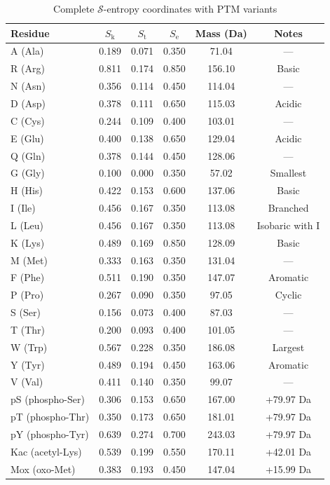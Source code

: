 \documentclass[11pt,twocolumn]{article}
\newcommand{\sentropy}{$\mathcal{S}$-entropy}
\newcommand{\Sk}{S_{\text{k}}}
\newcommand{\St}{S_{\text{t}}}
\newcommand{\Se}{S_{\text{e}}}
\begin{document}
\begin{table}[h]
\centering
\caption{Complete \sentropy{} coordinates with PTM variants}
\label{tab:complete_coords}
\begin{tabular}{@{}lccccc@{}}
\toprule
Residue & $\Sk$ & $\St$ & $\Se$ & Mass (Da) & Notes \\
\midrule
A (Ala) & 0.189 & 0.071 & 0.350 & 71.04 & --- \\
R (Arg) & 0.811 & 0.174 & 0.850 & 156.10 & Basic \\
N (Asn) & 0.356 & 0.114 & 0.450 & 114.04 & --- \\
D (Asp) & 0.378 & 0.111 & 0.650 & 115.03 & Acidic \\
C (Cys) & 0.244 & 0.109 & 0.400 & 103.01 & --- \\
E (Glu) & 0.400 & 0.138 & 0.650 & 129.04 & Acidic \\
Q (Gln) & 0.378 & 0.144 & 0.450 & 128.06 & --- \\
G (Gly) & 0.100 & 0.000 & 0.350 & 57.02 & Smallest \\
H (His) & 0.422 & 0.153 & 0.600 & 137.06 & Basic \\
I (Ile) & 0.456 & 0.167 & 0.350 & 113.08 & Branched \\
L (Leu) & 0.456 & 0.167 & 0.350 & 113.08 & Isobaric with I \\
K (Lys) & 0.489 & 0.169 & 0.850 & 128.09 & Basic \\
M (Met) & 0.333 & 0.163 & 0.350 & 131.04 & --- \\
F (Phe) & 0.511 & 0.190 & 0.350 & 147.07 & Aromatic \\
P (Pro) & 0.267 & 0.090 & 0.350 & 97.05 & Cyclic \\
S (Ser) & 0.156 & 0.073 & 0.400 & 87.03 & --- \\
T (Thr) & 0.200 & 0.093 & 0.400 & 101.05 & --- \\
W (Trp) & 0.567 & 0.228 & 0.350 & 186.08 & Largest \\
Y (Tyr) & 0.489 & 0.194 & 0.450 & 163.06 & Aromatic \\
V (Val) & 0.411 & 0.140 & 0.350 & 99.07 & --- \\
\midrule
pS (phospho-Ser) & 0.306 & 0.153 & 0.650 & 167.00 & +79.97 Da \\
pT (phospho-Thr) & 0.350 & 0.173 & 0.650 & 181.01 & +79.97 Da \\
pY (phospho-Tyr) & 0.639 & 0.274 & 0.700 & 243.03 & +79.97 Da \\
Kac (acetyl-Lys) & 0.539 & 0.199 & 0.550 & 170.11 & +42.01 Da \\
Mox (oxo-Met) & 0.383 & 0.193 & 0.450 & 147.04 & +15.99 Da \\
\bottomrule
\end{tabular}
\end{table}
\end{document}
